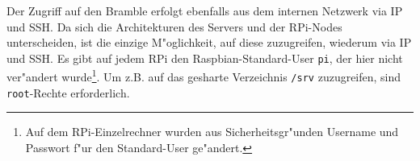 Der Zugriff auf den Bramble erfolgt ebenfalls aus dem internen Netzwerk via IP und SSH. Da sich die Architekturen des Servers und der RPi-Nodes unterscheiden, ist die einzige M"oglichkeit, auf diese zuzugreifen, wiederum via IP und SSH. Es gibt auf jedem RPi den Raspbian-Standard-User \texttt{pi}, der hier nicht ver"andert wurde\footnote{Auf dem RPi-Einzelrechner wurden aus Sicherheitsgr"unden Username und Passwort f"ur den Standard-User ge"andert.}. Um z.B. auf das gesharte Verzeichnis \texttt{/srv} zuzugreifen, sind \texttt{root}-Rechte erforderlich. 
\endinput 
